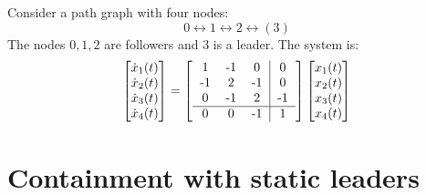 \begin{description}
        \begin{example}
            Consider a path graph with four nodes:
            \[ 0 \leftrightarrow 1 \leftrightarrow 2 \leftrightarrow (3) \]
            The nodes $0, 1, 2$ are followers and $3$ is a leader. The system is:
            \[
                \begin{bmatrix}
                    \dot{x}_1(t) \\ \dot{x}_2(t) \\ \dot{x}_3(t) \\ \dot{x}_4(t)
                \end{bmatrix} = 
                \begin{bmatrix}
                    \begin{tabular}{ccc|c}
                        1   & -1    & 0     & 0     \\
                        -1  & 2     & -1    & 0     \\
                        0   & -1    & 2    & -1    \\
                        \hline
                        0   & 0     & -1    & 1     \\
                    \end{tabular}
                \end{bmatrix}
                \begin{bmatrix}
                    x_1(t) \\ x_2(t) \\ x_3(t) \\ x_4(t)
                \end{bmatrix}
            \]
    \end{example}

\end{description}



\section{Containment with static leaders}

